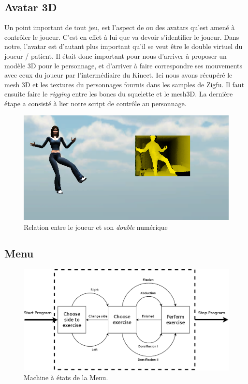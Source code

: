 \subsection{Avatar 3D}   
Un point important de tout jeu, est l'aspect de ou des avatars qu'est amené à contrôler le joueur. C'est en effet à lui que va devoir s'identifier le joueur. Dans notre, l'avatar est d'autant plus important qu'il se veut être le double virtuel du joueur / patient. Il était donc important pour nous d'arriver à proposer un modèle 3D pour le personnage, et d'arriver à faire correspondre ses mouvements avec ceux du joueur par l'intermédiaire du Kinect. Ici nous avons récupéré le mesh 3D et les textures du personnages fournis dans les samples de Zigfu. Il faut ensuite faire le \textit{rigging} entre les bones du squelette et le mesh3D. La dernière étape a consisté à lier notre script de contrôle au personnage.
\begin{figure}
\begin{center}
  \includegraphics[scale=1]{images/avatar3D.png} \caption{Relation entre le joueur et son \textit{double} numérique}
\end{center}
\end{figure}

    
\subsection{Menu}
    
\begin{figure}[h!]
\centering
\includegraphics[width=\linewidth]{images/menu}
\caption{Machine à états de la Menu.}
\end{figure}
    

